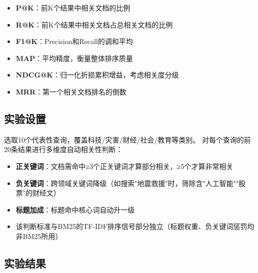 \documentclass[12pt,a4paper]{ctexart}
\begin{document}
\begin{itemize}
    \item \textbf{P@K}：前K个结果中相关文档的比例
    \item \textbf{R@K}：前K个结果中相关文档占总相关文档的比例
    \item \textbf{F1@K}：Precision和Recall的调和平均
    \item \textbf{MAP}：平均精度，衡量整体排序质量
    \item \textbf{NDCG@K}：归一化折损累积增益，考虑相关度分级
    \item \textbf{MRR}：第一个相关文档排名的倒数
\end{itemize}

\subsection{实验设置}

选取10个代表性查询，覆盖科技/灾害/财经/社会/教育等类别。
对每个查询的前20条结果进行多维度自动相关性判断：
\begin{itemize}
    \item \textbf{正关键词}：文档需命中≥3个正关键词才算部分相关，≥5个才算非常相关
    \item \textbf{负关键词}：跨领域关键词降级（如搜索"地震救援"时，筛除含"人工智能""股票"的财经文）
    \item \textbf{标题加成}：标题命中核心词自动升一级
    \item 该判断标准与BM25的TF-IDF排序信号部分独立（标题权重、负关键词惩罚均非BM25所用）
\end{itemize}

\subsection{实验结果}
\end{document}
